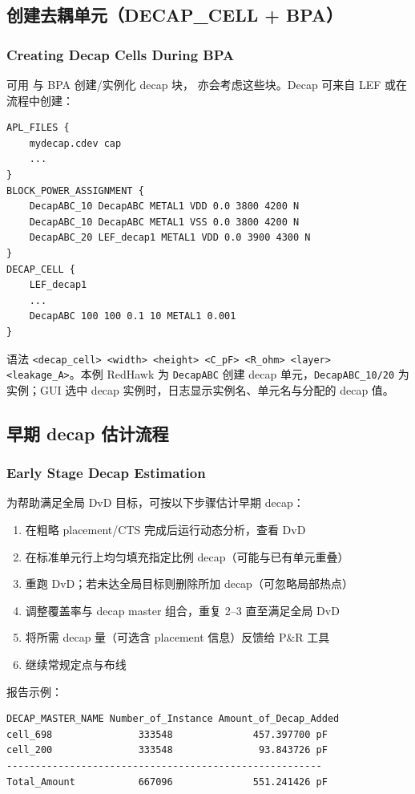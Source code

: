 \subsection{创建去耦单元（DECAP\_CELL + BPA）}
\subsubsection*{Creating Decap Cells During BPA}

可用  与 BPA 创建/实例化 decap 块， 亦会考虑这些块。Decap 可来自 LEF 或在流程中创建：
\begin{lstlisting}
APL_FILES {
    mydecap.cdev cap
    ...
}
BLOCK_POWER_ASSIGNMENT {
    DecapABC_10 DecapABC METAL1 VDD 0.0 3800 4200 N
    DecapABC_10 DecapABC METAL1 VSS 0.0 3800 4200 N
    DecapABC_20 LEF_decap1 METAL1 VDD 0.0 3900 4300 N
}
DECAP_CELL {
    LEF_decap1
    ...
    DecapABC 100 100 0.1 10 METAL1 0.001
}
\end{lstlisting}
语法 \texttt{<decap\_cell> <width> <height> <C\_pF> <R\_ohm> <layer> <leakage\_A>}。本例 RedHawk 为 \texttt{DecapABC} 创建 decap 单元，\texttt{DecapABC\_10/20} 为实例；GUI 选中 decap 实例时，日志显示实例名、单元名与分配的 decap 值。

\subsection{早期 decap 估计流程}
\subsubsection*{Early Stage Decap Estimation}

为帮助满足全局 DvD 目标，可按以下步骤估计早期 decap：
\begin{enumerate}
  \item 在粗略 placement/CTS 完成后运行动态分析，查看 DvD
  \item {} 在标准单元行上均匀填充指定比例 decap（可能与已有单元重叠）
  \item 重跑 DvD；若未达全局目标则删除所加 decap（可忽略局部热点）
  \item 调整覆盖率与 decap master 组合，重复 2--3 直至满足全局 DvD
  \item 将所需 decap 量（可选含 placement 信息）反馈给 P\&R 工具
  \item 继续常规定点与布线
\end{enumerate}
报告示例：
\begin{lstlisting}
DECAP_MASTER_NAME Number_of_Instance Amount_of_Decap_Added
cell_698               333548              457.397700 pF
cell_200               333548               93.843726 pF
-------------------------------------------------------
Total_Amount           667096              551.241426 pF
\end{lstlisting}

